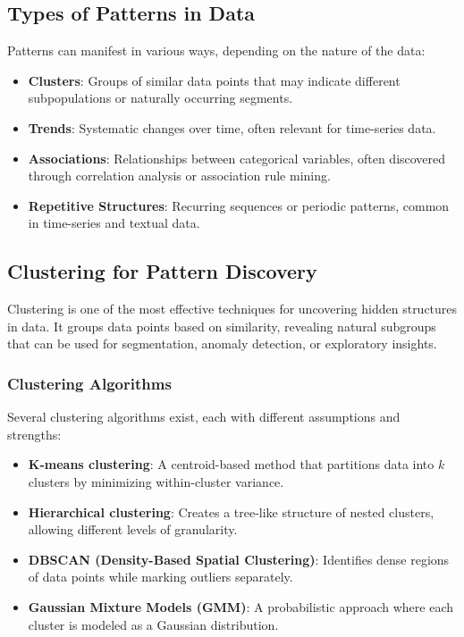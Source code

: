 \documentclass[12pt,openany, draft]{book}
\begin{document}
\subsection{Types of Patterns in Data}

Patterns can manifest in various ways, depending on the nature of the data:
\begin{itemize}
    \item \textbf{Clusters}: Groups of similar data points that may indicate different subpopulations or naturally occurring segments.
    \item \textbf{Trends}: Systematic changes over time, often relevant for time-series data.
    \item \textbf{Associations}: Relationships between categorical variables, often discovered through correlation analysis or association rule mining.
    \item \textbf{Repetitive Structures}: Recurring sequences or periodic patterns, common in time-series and textual data.
\end{itemize}

\subsection{Clustering for Pattern Discovery}

Clustering is one of the most effective techniques for uncovering hidden structures in data. It groups data points based on similarity, revealing natural subgroups that can be used for segmentation, anomaly detection, or exploratory insights.

\subsubsection{Clustering Algorithms}

Several clustering algorithms exist, each with different assumptions and strengths:
\begin{itemize}
    \item \textbf{K-means clustering}: A centroid-based method that partitions data into \( k \) clusters by minimizing within-cluster variance.
    \item \textbf{Hierarchical clustering}: Creates a tree-like structure of nested clusters, allowing different levels of granularity.
    \item \textbf{DBSCAN (Density-Based Spatial Clustering)}: Identifies dense regions of data points while marking outliers separately.
    \item \textbf{Gaussian Mixture Models (GMM)}: A probabilistic approach where each cluster is modeled as a Gaussian distribution.
\end{itemize}
\end{document}
